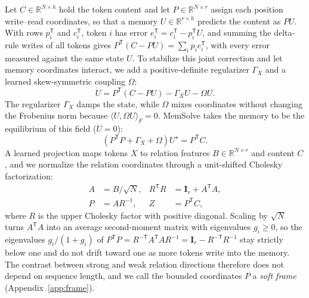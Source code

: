 \documentclass[10pt,twocolumn]{article}
\newcommand{\R}{\mathbb{R}}
\newcommand{\I}{\mathbf{I}}
\newcommand{\T}{\mathsf{T}}
\begin{document}
Let $C\in\R^{N\times h}$ hold the token content and let $P\in\R^{N\times r}$
assign each position write--read coordinates, so that a memory
$U\in\R^{r\times h}$ predicts the content as $PU$.
With rows $p_i^\T$ and $c_i^\T$, token $i$ has error
$e_i^\T=c_i^\T-p_i^\T U$, and summing the delta-rule writes of all tokens gives
$P^\T(C-PU)=\sum_ip_ie_i^\T$, with every error measured against the same state
$U$.
To stabilize this joint correction and let memory coordinates interact, we add
a positive-definite regularizer $\Gamma_X$ and a learned skew-symmetric
coupling $\Omega$:
\begin{equation}
 \dot U=P^\T(C-PU)-\Gamma_X U-\Omega U.
 \label{eq:joint-field}
\end{equation}
The regularizer $\Gamma_X$ damps the state, while $\Omega$ mixes coordinates
without changing
the Frobenius norm because $\langle U,\Omega U\rangle_F=0$.
MemSolve takes the memory to be the equilibrium of this field ($\dot U=0$):
\begin{equation}
 (P^\T P+\Gamma_X+\Omega)U^\star=P^\T C.
 \label{eq:joint-equilibrium}
\end{equation}
A learned projection maps tokens $X$ to relation features
$B\in\R^{N\times r}$ and content $C$, and we normalize the relation coordinates
through a unit-shifted Cholesky factorization:
\begin{equation}
 \begin{aligned}
 A&=B/\sqrt{N}, & R^\T R&=\I_r+A^\T A,\\
 P&=AR^{-1}, & Z&=P^\T C,
 \end{aligned}
 \label{eq:frame}
\end{equation}
where $R$ is the upper Cholesky factor with positive diagonal.
Scaling by $\sqrt N$ turns $A^\T A$ into an average second-moment matrix with
eigenvalues $g_i\ge0$, so the eigenvalues $g_i/(1+g_i)$ of
$P^\T P=R^{-\T}A^\T AR^{-1}=\I_r-R^{-\T}R^{-1}$ stay strictly below one and do
not drift toward one as more tokens write into the memory.
The contrast between strong and weak relation directions therefore does not
depend on sequence length, and we call the bounded coordinates $P$ a
\emph{soft frame} (Appendix~\ref{app:frame}).
\end{document}
